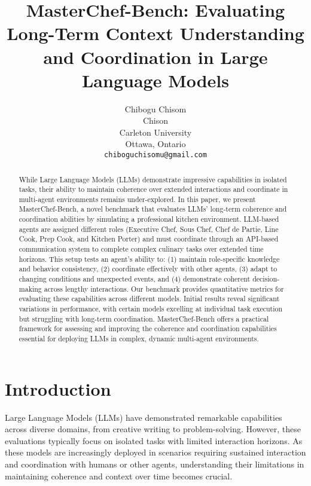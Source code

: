 \documentclass{article}
\title{MasterChef-Bench: Evaluating Long-Term Context Understanding and Coordination in Large Language Models}
\author{
  Chibogu Chisom\\
  Chison \\
  Carleton University \\
  Ottawa, Ontario \\
  \texttt{chiboguchisomu@gmail.com} \\
}
\begin{document}
\maketitle

\begin{abstract}
While Large Language Models (LLMs) demonstrate impressive capabilities in isolated tasks, their ability to maintain coherence over extended interactions and coordinate in multi-agent environments remains under-explored. In this paper, we present MasterChef-Bench, a novel benchmark that evaluates LLMs' long-term coherence and coordination abilities by simulating a professional kitchen environment. LLM-based agents are assigned different roles (Executive Chef, Sous Chef, Chef de Partie, Line Cook, Prep Cook, and Kitchen Porter) and must coordinate through an API-based communication system to complete complex culinary tasks over extended time horizons. This setup tests an agent's ability to: (1) maintain role-specific knowledge and behavior consistency, (2) coordinate effectively with other agents, (3) adapt to changing conditions and unexpected events, and (4) demonstrate coherent decision-making across lengthy interactions. Our benchmark provides quantitative metrics for evaluating these capabilities across different models. Initial results reveal significant variations in performance, with certain models excelling at individual task execution but struggling with long-term coordination. MasterChef-Bench offers a practical framework for assessing and improving the coherence and coordination capabilities essential for deploying LLMs in complex, dynamic multi-agent environments.
\end{abstract}


\section{Introduction}
Large Language Models (LLMs) have demonstrated remarkable capabilities across diverse domains, from creative writing to problem-solving. However, these evaluations typically focus on isolated tasks with limited interaction horizons. As these models are increasingly deployed in scenarios requiring sustained interaction and coordination with humans or other agents, understanding their limitations in maintaining coherence and context over time becomes crucial.
\end{document}
